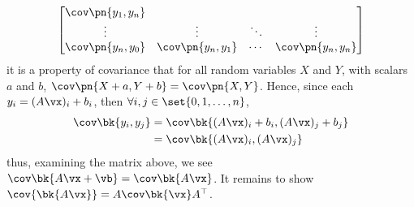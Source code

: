 \documentclass[189]{pset}
\begin{document}
\begin{enumerate}
\begin{align*}
\begin{bmatrix}
              \cov\pn{y_1, y_n} \\
              \vdots & \vdots & \ddots & \vdots \\
              \cov\pn{y_n, y_0} & \cov\pn{y_n, y_1} & \cdots &
              \cov\pn{y_n, y_n}
            \end{bmatrix}
        \end{align*}
        it is a property of covariance that for all random variables
        $X$ and $Y$, with scalars $a$ and $b$, $\cov\pn{X+a,Y+b} =
        \cov\pn{X,Y}$. Hence, since each $y_i = (A\vx)_i + b_i$, then
        $\forall i,j \in \set{0,1,\ldots,n}$,
        \begin{align*}
          \cov\bk{y_i,y_j}
          &= \cov\bk{(A\vx)_i + b_i, (A\vx)_j + b_j} \\
          &= \cov\bk{(A\vx)_i, (A\vx)_j}
        \end{align*}
        thus, examining the matrix above, we see $\cov\bk{A\vx + \vb}
        = \cov\bk{A\vx}$. It remains to show $\cov{\bk{A\vx}} =
        A\cov\bk{\vx}A^\top$.


\end{enumerate}
\end{document}
